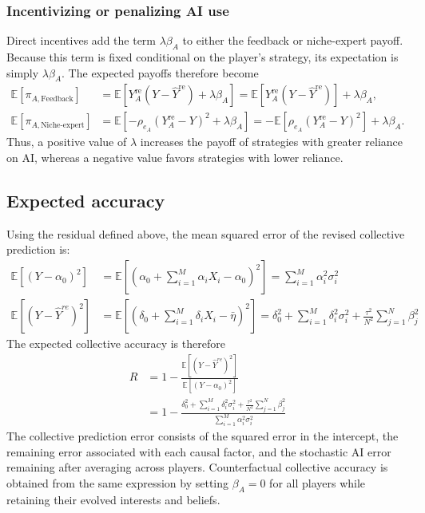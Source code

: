 \documentclass[12pt]{article}
\begin{document}
\subsubsection*{Incentivizing or penalizing AI use}

Direct incentives add the term $\lambda\beta_A$ to either the feedback or niche-expert payoff. 
Because this term is fixed conditional on the player's strategy, its expectation is simply $\lambda\beta_A$. 
The expected payoffs therefore become
\begin{align}
\mathbb{E}[\pi_{A, \textrm{Feedback}}]&=\mathbb{E}\left[Y_A^{\mathrm{re}}(Y-\hat{Y}^{\mathrm{re}}) + \lambda\beta_A\right] = \mathbb{E}\left[Y_A^{\mathrm{re}}(Y-\hat{Y}^{\mathrm{re}})\right] + \lambda\beta_A,\\
\mathbb{E}[\pi_{A, \textrm{Niche-expert}}] &= \mathbb{E}\left[-\rho_{e_A}(Y_A^{\mathrm{re}}-Y)^2 + \lambda\beta_A\right] = -\mathbb{E}\left[\rho_{e_A}(Y_A^{\mathrm{re}}-Y)^2\right] + \lambda\beta_A.
\end{align}
Thus, a positive value of $\lambda$ increases the payoff of strategies with greater reliance on AI, whereas a negative value favors strategies with lower reliance.

\subsection*{Expected accuracy}

Using the residual defined above, the mean squared error of the revised collective prediction is:
\begin{align}
\mathbb{E}[(Y - \alpha_0)^2] &= \mathbb{E}\left[\left(\alpha_0 +\sum_{i = 1}^{M}\alpha_iX_i - \alpha_0\right)^2\right] = \sum_{i = 1}^{M}\alpha_i^2\sigma_i^2\\
\mathbb{E}[(Y - \hat{Y}^{re})^2] &= \mathbb{E}\left[\left(\delta_0 +\sum_{i = 1}^{M}\delta_iX_i - \bar{\eta}\right)^2\right] = \delta_0^2 + \sum_{i = 1}^{M}\delta_i^2\sigma_i^2 + \frac{\tau^2}{N^2}\sum_{j = 1}^{N}\beta_j^2
\end{align}
The expected collective accuracy is therefore
\begin{align}
R
&= 1 - \frac{\mathbb{E}[(Y -  \hat{Y}^{re})^2]}{\mathbb{E}[(Y - \alpha_0)^2]}\\[6pt]
&= 1- \frac{\delta_0^2 + \sum_{i = 1}^{M}\delta_i^2\sigma_i^2 + \frac{\tau^2}{N^2}\sum_{j = 1}^{N}\beta_j^2}{\sum_{i = 1}^{M}\alpha_i^2\sigma_i^2}
\end{align}
The collective prediction error consists of the squared error in the intercept, the remaining error associated with each causal factor, and the stochastic AI error remaining after averaging across players.
Counterfactual collective accuracy is obtained from the same expression by setting $\beta_A=0$ for all players while retaining their evolved interests and beliefs.
\end{document}
